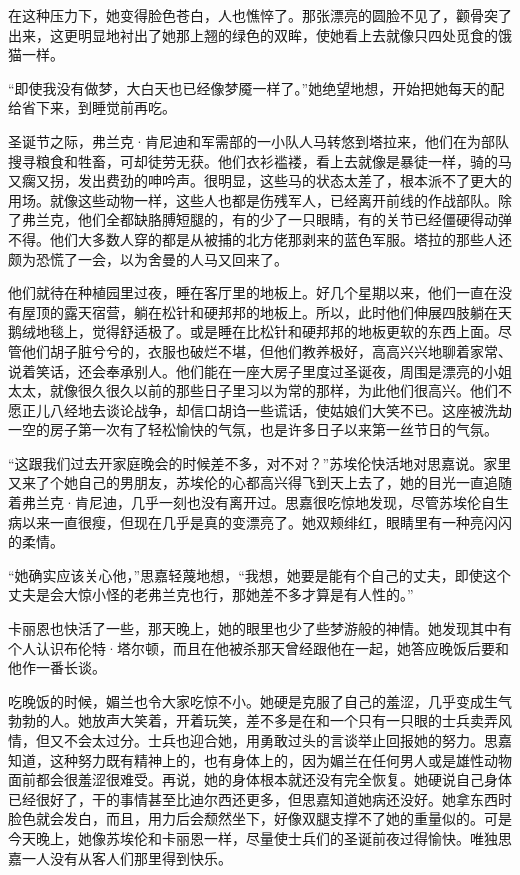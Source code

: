 \par 在这种压力下，她变得脸色苍白，人也憔悴了。那张漂亮的圆脸不见了，颧骨突了出来，这更明显地衬出了她那上翘的绿色的双眸，使她看上去就像只四处觅食的饿猫一样。
\par “即使我没有做梦，大白天也已经像梦魇一样了。”她绝望地想，开始把她每天的配给省下来，到睡觉前再吃。
\par 圣诞节之际，弗兰克·肯尼迪和军需部的一小队人马转悠到塔拉来，他们在为部队搜寻粮食和牲畜，可却徒劳无获。他们衣衫褴褛，看上去就像是暴徒一样，骑的马又瘸又拐，发出费劲的呻吟声。很明显，这些马的状态太差了，根本派不了更大的用场。就像这些动物一样，这些人也都是伤残军人，已经离开前线的作战部队。除了弗兰克，他们全都缺胳膊短腿的，有的少了一只眼睛，有的关节已经僵硬得动弹不得。他们大多数人穿的都是从被捕的北方佬那剥来的蓝色军服。塔拉的那些人还颇为恐慌了一会，以为舍曼的人马又回来了。
\par 他们就待在种植园里过夜，睡在客厅里的地板上。好几个星期以来，他们一直在没有屋顶的露天宿营，躺在松针和硬邦邦的地板上。所以，此时他们伸展四肢躺在天鹅绒地毯上，觉得舒适极了。或是睡在比松针和硬邦邦的地板更软的东西上面。尽管他们胡子脏兮兮的，衣服也破烂不堪，但他们教养极好，高高兴兴地聊着家常、说着笑话，还会奉承别人。他们能在一座大房子里度过圣诞夜，周围是漂亮的小姐太太，就像很久很久以前的那些日子里习以为常的那样，为此他们很高兴。他们不愿正儿八经地去谈论战争，却信口胡诌一些谎话，使姑娘们大笑不已。这座被洗劫一空的房子第一次有了轻松愉快的气氛，也是许多日子以来第一丝节日的气氛。
\par “这跟我们过去开家庭晚会的时候差不多，对不对？”苏埃伦快活地对思嘉说。家里又来了个她自己的男朋友，苏埃伦的心都高兴得飞到天上去了，她的目光一直追随着弗兰克·肯尼迪，几乎一刻也没有离开过。思嘉很吃惊地发现，尽管苏埃伦自生病以来一直很瘦，但现在几乎是真的变漂亮了。她双颊绯红，眼睛里有一种亮闪闪的柔情。
\par “她确实应该关心他，”思嘉轻蔑地想，“我想，她要是能有个自己的丈夫，即使这个丈夫是会大惊小怪的老弗兰克也行，那她差不多才算是有人性的。”
\par 卡丽恩也快活了一些，那天晚上，她的眼里也少了些梦游般的神情。她发现其中有个人认识布伦特·塔尔顿，而且在他被杀那天曾经跟他在一起，她答应晚饭后要和他作一番长谈。
\par 吃晚饭的时候，媚兰也令大家吃惊不小。她硬是克服了自己的羞涩，几乎变成生气勃勃的人。她放声大笑着，开着玩笑，差不多是在和一个只有一只眼的士兵卖弄风情，但又不会太过分。士兵也迎合她，用勇敢过头的言谈举止回报她的努力。思嘉知道，这种努力既有精神上的，也有身体上的，因为媚兰在任何男人或是雄性动物面前都会很羞涩很难受。再说，她的身体根本就还没有完全恢复。她硬说自己身体已经很好了，干的事情甚至比迪尔西还更多，但思嘉知道她病还没好。她拿东西时脸色就会发白，而且，用力后会颓然坐下，好像双腿支撑不了她的重量似的。可是今天晚上，她像苏埃伦和卡丽恩一样，尽量使士兵们的圣诞前夜过得愉快。唯独思嘉一人没有从客人们那里得到快乐。

